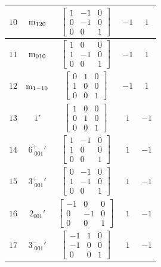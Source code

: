 \documentclass[fleqn,8pt]{jsarticle}
\begin{document}
\begin{longtable}{ccccc}
$ 10 $ & $ {\rm m}_{120} $ & $ \begin{bmatrix} 1 & -1 & 0 \\ 0 & -1 & 0 \\ 0 & 0 & 1 \end{bmatrix} $ & $ -1 $ & $ 1 $ \\ \hline
$ 11 $ & $ {\rm m}_{010} $ & $ \begin{bmatrix} 1 & 0 & 0 \\ 1 & -1 & 0 \\ 0 & 0 & 1 \end{bmatrix} $ & $ -1 $ & $ 1 $ \\ \hline
$ 12 $ & $ {\rm m}_{1-10} $ & $ \begin{bmatrix} 0 & 1 & 0 \\ 1 & 0 & 0 \\ 0 & 0 & 1 \end{bmatrix} $ & $ -1 $ & $ 1 $ \\ \hline
$ 13 $ & $ 1{}' $ & $ \begin{bmatrix} 1 & 0 & 0 \\ 0 & 1 & 0 \\ 0 & 0 & 1 \end{bmatrix} $ & $ 1 $ & $ -1 $ \\ \hline
$ 14 $ & $ 6^{+}_{\,\,001}{}' $ & $ \begin{bmatrix} 1 & -1 & 0 \\ 1 & 0 & 0 \\ 0 & 0 & 1 \end{bmatrix} $ & $ 1 $ & $ -1 $ \\ \hline
$ 15 $ & $ 3^{+}_{\,\,001}{}' $ & $ \begin{bmatrix} 0 & -1 & 0 \\ 1 & -1 & 0 \\ 0 & 0 & 1 \end{bmatrix} $ & $ 1 $ & $ -1 $ \\ \hline
$ 16 $ & $ 2{}_{001}{}' $ & $ \begin{bmatrix} -1 & 0 & 0 \\ 0 & -1 & 0 \\ 0 & 0 & 1 \end{bmatrix} $ & $ 1 $ & $ -1 $ \\ \hline
$ 17 $ & $ 3^{-}_{\,\,001}{}' $ & $ \begin{bmatrix} -1 & 1 & 0 \\ -1 & 0 & 0 \\ 0 & 0 & 1 \end{bmatrix} $ & $ 1 $ & $ -1 $ \\ \hline

\end{longtable}
\end{document}
